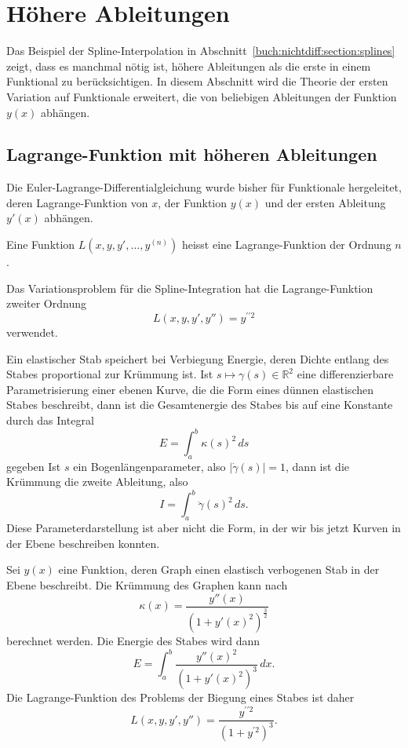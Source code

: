 %
%
%
\section{Höhere Ableitungen
\label{buch:variation:section:hoehereableitungen}}
Das Beispiel der Spline-Interpolation in
Abschnitt~\ref{buch:nichtdiff:section:splines}
zeigt, dass es manchmal
nötig ist, höhere Ableitungen als die erste in einem Funktional
zu berücksichtigen.
In diesem Abschnitt wird die Theorie der ersten Variation auf
Funktionale erweitert, die von beliebigen Ableitungen der Funktion $y(x)$
abhängen.

%
%
\subsection{Lagrange-Funktion mit höheren Ableitungen}
Die Euler-Lagrange-Differentialgleichung wurde bisher für Funktionale
hergeleitet, deren Lagrange-Funktion von $x$, der Funktion $y(x)$ und
der ersten Ableitung $y'(x)$ abhängen.

\begin{definition}
Eine Funktion $L(x,y,y',\dots,y^{(n)})$ heisst eine Lagrange-Funktion
der Ordnung $n$.
%
\end{definition}

\begin{beispiel}
Das Variationsproblem für die Spline-Integration hat die Lagrange-Funktion
zweiter Ordnung
\[
L(x,y,y',y'') = y^{\prime\prime 2}
\]
verwendet.
\end{beispiel}

Ein elastischer Stab speichert bei Verbiegung Energie, deren Dichte
entlang des Stabes proportional zur Krümmung ist.
Ist $s\mapsto \gamma(s)\in\mathbb{R}^2$ eine differenzierbare
Parametrisierung einer ebenen Kurve, die die Form eines dünnen elastischen
Stabes beschreibt, dann ist die Gesamtenergie des Stabes bis auf
eine Konstante durch das Integral
\[
E
=
\int_a^b \kappa(s)^2 \,ds
\]
gegeben
Ist $s$ ein Bogenlängenparameter, also $|\dot{\gamma}(s)|=1$, dann ist
die Krümmung die zweite Ableitung, also
\[
I = \int_a^b \ddot{\gamma}(s)^2\,ds.
\]
Diese Parameterdarstellung ist aber nicht die Form, in der wir bis jetzt
Kurven in der Ebene beschreiben konnten.

Sei $y(x)$ eine Funktion, deren Graph einen elastisch verbogenen Stab
in der Ebene beschreibt.
Die Krümmung des Graphen kann nach
\[
\kappa(x)
=
\frac{y''(x)}{(1+y'(x)^2)^{\frac32}}
\]
berechnet werden.
Die Energie des Stabes wird dann
\[
E
=
\int_a^b \frac{y''(x)^2}{(1+y'(x)^2)^3}\,dx.
\]
Die Lagrange-Funktion des Problems der Biegung eines Stabes ist daher
\[
L(x,y,y',y'')
=
\frac{y^{\prime\prime 2}}{(1+y^{\prime 2})^3}.
\]

